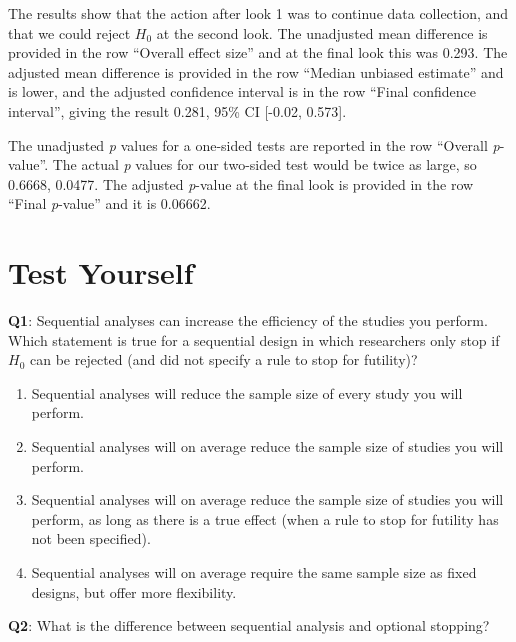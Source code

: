 \documentclass[
  oneside]{book}
\providecommand{\tightlist}{%
  \setlength{\itemsep}{0pt}\setlength{\parskip}{0pt}}
\begin{document}
The results show that the action after look 1 was to continue data collection, and that we could reject \(H_0\) at the second look. The unadjusted mean difference is provided in the row ``Overall effect size'' and at the final look this was 0.293. The adjusted mean difference is provided in the row ``Median unbiased estimate'' and is lower, and the adjusted confidence interval is in the row ``Final confidence interval'', giving the result 0.281, 95\% CI {[}-0.02, 0.573{]}.

The unadjusted \emph{p} values for a one-sided tests are reported in the row ``Overall \emph{p}-value''. The actual \emph{p} values for our two-sided test would be twice as large, so 0.6668, 0.0477. The adjusted \emph{p}-value at the final look is provided in the row ``Final \emph{p}-value'' and it is 0.06662.

\hypertarget{test-yourself-8}{%
\section{Test Yourself}\label{test-yourself-8}}

\textbf{Q1}: Sequential analyses can increase the efficiency of the studies you perform. Which statement is true for a sequential design in which researchers only stop if \(H_0\) can be rejected (and did not specify a rule to stop for futility)?

\begin{enumerate}
\def\labelenumi{\Alph{enumi})}
\tightlist
\item
  Sequential analyses will reduce the sample size of every study you will perform.
\item
  Sequential analyses will on average reduce the sample size of studies you will perform.
\item
  Sequential analyses will on average reduce the sample size of studies you will perform, as long as there is a true effect (when a rule to stop for futility has not been specified).
\item
  Sequential analyses will on average require the same sample size as fixed designs, but offer more flexibility.
\end{enumerate}

\textbf{Q2}: What is the difference between sequential analysis and optional stopping?
\end{document}
